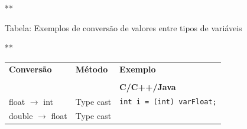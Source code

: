 \documentclass[12pt,a4paper]{article}
\begin{document}
    **

Tabela: Exemplos de conversão de valores entre tipos de variáveis

**

\begin{longtable}[]{@{}lll@{}}
\toprule
\endhead
\begin{minipage}[t]{0.21\columnwidth}\raggedright
\textbf{Conversão}\strut
\end{minipage} & \begin{minipage}[t]{0.22\columnwidth}\raggedright
\textbf{Método}\strut
\end{minipage} & \begin{minipage}[t]{0.48\columnwidth}\raggedright
\textbf{Exemplo}\strut
\end{minipage}\tabularnewline
\begin{minipage}[t]{0.21\columnwidth}\raggedright
\strut
\end{minipage} & \begin{minipage}[t]{0.22\columnwidth}\raggedright
\strut
\end{minipage} & \begin{minipage}[t]{0.48\columnwidth}\raggedright
\strut
\end{minipage}\tabularnewline
\begin{minipage}[t]{0.21\columnwidth}\raggedright
\strut
\end{minipage} & \begin{minipage}[t]{0.22\columnwidth}\raggedright
\strut
\end{minipage} & \begin{minipage}[t]{0.48\columnwidth}\raggedright
\textbf{C/C++/Java}\strut
\end{minipage}\tabularnewline
\begin{minipage}[t]{0.21\columnwidth}\raggedright
float \(\rightarrow\) int\strut
\end{minipage} & \begin{minipage}[t]{0.22\columnwidth}\raggedright
Type cast\strut
\end{minipage} & \begin{minipage}[t]{0.48\columnwidth}\raggedright
\texttt{int\ i\ =\ (int)\ varFloat;}\strut
\end{minipage}\tabularnewline
\begin{minipage}[t]{0.21\columnwidth}\raggedright
double \(\rightarrow\) float\strut
\end{minipage} & \begin{minipage}[t]{0.22\columnwidth}\raggedright
Type cast\strut

\end{minipage}
\end{longtable}
\end{document}
